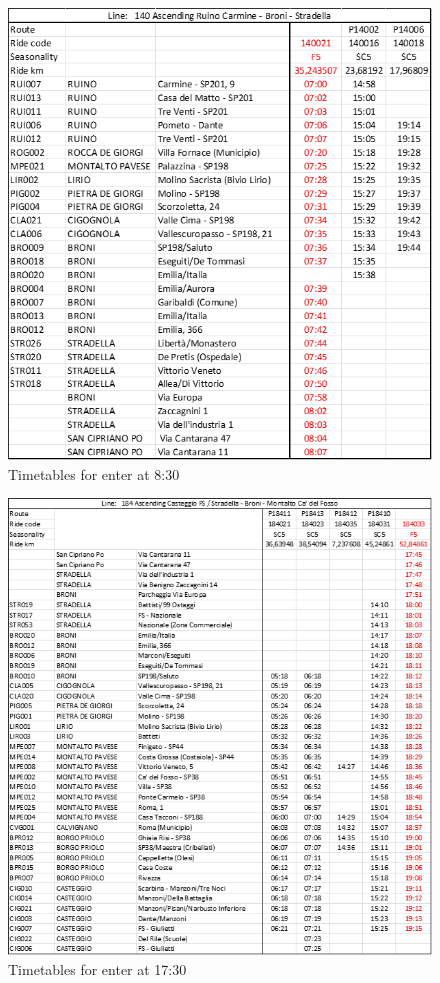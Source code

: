 \newpage
\thispagestyle{empty}
\begin{figure}[h]
    \centering
    \includegraphics[width=1\textwidth]{Images/Scheduling/timetables/enter_8_30.png}
    \caption{Timetables for enter at 8:30}
    \label{fig:enter830}
\end{figure}
\newpage
\thispagestyle{empty}
\begin{figure}[h!]
    \centering
    \includegraphics[width=1\textwidth]{Images/Scheduling/timetables/Exit_17_30.png}
    \caption{Timetables for enter at 17:30}
    \label{fig:exit1730}
\end{figure}
\newpage
\newpage

